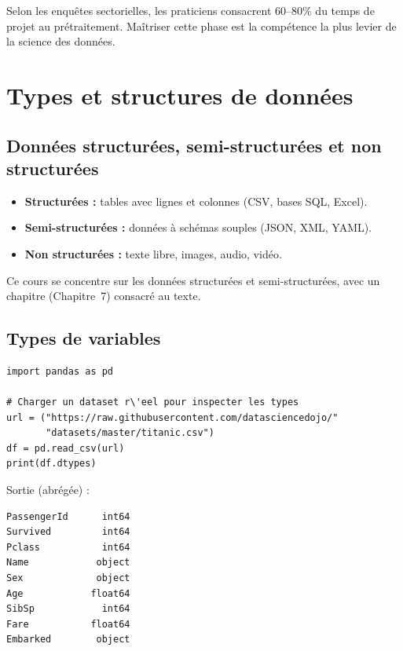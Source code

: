 \begin{datatip}
Selon les enqu\^etes sectorielles, les praticiens consacrent 60--80\% du temps de projet au pr\'etraitement. Ma\^itriser cette phase est la comp\'etence la plus levier de la science des donn\'ees.
\end{datatip}

\section{Types et structures de donn\'ees}

\subsection{Donn\'ees structur\'ees, semi-structur\'ees et non structur\'ees}

\begin{itemize}
  \item \textbf{Structur\'ees :} tables avec lignes et colonnes (CSV, bases SQL, Excel).
  \item \textbf{Semi-structur\'ees :} donn\'ees \`a sch\'emas souples (JSON, XML, YAML).
  \item \textbf{Non structur\'ees :} texte libre, images, audio, vid\'eo.
\end{itemize}

Ce cours se concentre sur les donn\'ees structur\'ees et semi-structur\'ees, avec un chapitre (Chapitre~7) consacr\'e au texte.

\subsection{Types de variables}

\begin{verbatim}
import pandas as pd

# Charger un dataset r\'eel pour inspecter les types
url = ("https://raw.githubusercontent.com/datasciencedojo/"
       "datasets/master/titanic.csv")
df = pd.read_csv(url)
print(df.dtypes)
\end{verbatim}

Sortie (abr\'eg\'ee) :
\begin{verbatim}
PassengerId      int64
Survived         int64
Pclass           int64
Name            object
Sex             object
Age            float64
SibSp            int64
Fare           float64
Embarked        object
\end{verbatim}

